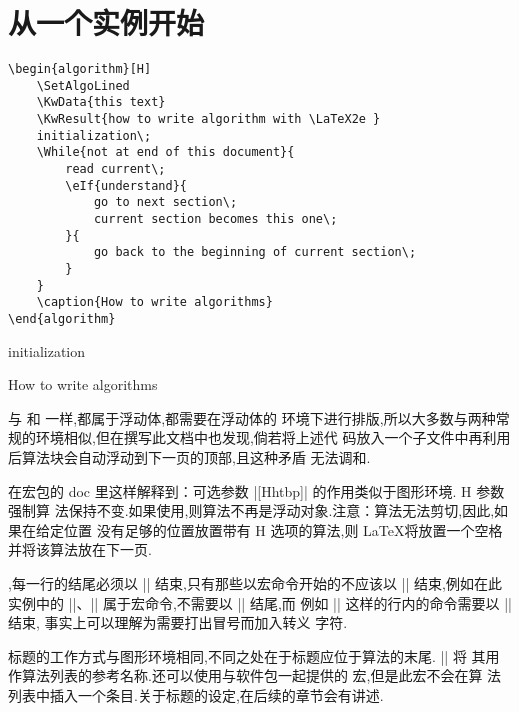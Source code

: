 


\section{从一个实例开始}
\begin{lstlisting}
\begin{algorithm}[H]
	\SetAlgoLined
	\KwData{this text}
	\KwResult{how to write algorithm with \LaTeX2e }
	initialization\;
	\While{not at end of this document}{
		read current\;
		\eIf{understand}{
			go to next section\;
			current section becomes this one\;
		}{
			go back to the beginning of current section\;
		}
	}
	\caption{How to write algorithms}
\end{algorithm}
\end{lstlisting}

\begin{algorithm}[H]
	\SetAlgoLined
	initialization\;
	\caption{How to write algorithms}
\end{algorithm}

\vspace{0.5em}

\par {} 与  和  一样,都属于浮动体,都需要在浮动体的
环境下进行排版,所以大多数与两种常规的环境相似,但在撰写此文档中也发现,倘若将上述代
码放入一个子文件中再利用 \verb|| 后算法块会自动浮动到下一页的顶部,且这种矛盾
无法调和.
\par 在宏包的 doc 里这样解释到：可选参数 |[Hhtbp]| 的作用类似于图形环境. H 参数强制算
法保持不变.如果使用,则算法不再是浮动对象.注意：算法无法剪切,因此,如果在给定位置
没有足够的位置放置带有 H 选项的算法,则 \LaTeX 将放置一个空格并将该算法放在下一页.
\par {},每一行的结尾必须以 |\;| 结束,只有那些以宏命令开始的不应该以 
|\;| 结束,例如在此实例中的 |\SetAlgoLined|、|| 属于宏命令,不需要以 |\;| 结尾,而
例如 |\initialization| 这样的行内的命令需要以 |\;| 结束, 事实上可以理解为需要打出冒号而加入转义
字符.
\par 标题的工作方式与图形环境相同,不同之处在于标题应位于算法的末尾. |\listofalgorithms| 将
其用作算法列表的参考名称.还可以使用与软件包一起提供的  宏,但是此宏不会在算
法列表中插入一个条目.关于标题的设定,在后续的章节会有讲述.

